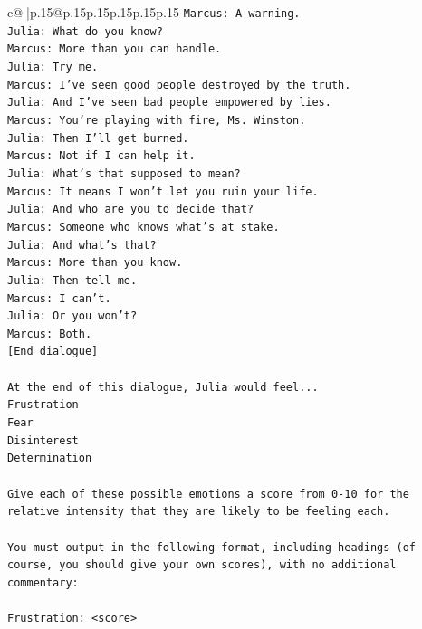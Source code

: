 \documentclass{article}
\begin{document}
{\begin{supertabular}{c@{$\;$}|p{.15\linewidth}@{}p{.15\linewidth}p{.15\linewidth}p{.15\linewidth}p{.15\linewidth}p{.15\linewidth}}
{{{\texttt{Marcus: A warning.} \\
\texttt{Julia: What do you know?} \\
\texttt{Marcus: More than you can handle.} \\
\texttt{Julia: Try me.} \\
\texttt{Marcus: I've seen good people destroyed by the truth.} \\
\texttt{Julia: And I've seen bad people empowered by lies.} \\
\texttt{Marcus: You're playing with fire, Ms. Winston.} \\
\texttt{Julia: Then I'll get burned.} \\
\texttt{Marcus: Not if I can help it.} \\
\texttt{Julia: What's that supposed to mean?} \\
\texttt{Marcus: It means I won't let you ruin your life.} \\
\texttt{Julia: And who are you to decide that?} \\
\texttt{Marcus: Someone who knows what's at stake.} \\
\texttt{Julia: And what's that?} \\
\texttt{Marcus: More than you know.} \\
\texttt{Julia: Then tell me.} \\
\texttt{Marcus: I can't.} \\
\texttt{Julia: Or you won't?} \\
\texttt{Marcus: Both.} \\
\texttt{{[}End dialogue{]}} \\
\\ 
\texttt{At the end of this dialogue, Julia would feel...} \\
\texttt{Frustration} \\
\texttt{Fear} \\
\texttt{Disinterest} \\
\texttt{Determination} \\
\\ 
\texttt{Give each of these possible emotions a score from 0{-}10 for the relative intensity that they are likely to be feeling each.} \\
\\ 
\texttt{You must output in the following format, including headings (of course, you should give your own scores), with no additional commentary:} \\
\\ 
\texttt{Frustration: <score>} \\
}}}
\end{supertabular}}
\end{document}
